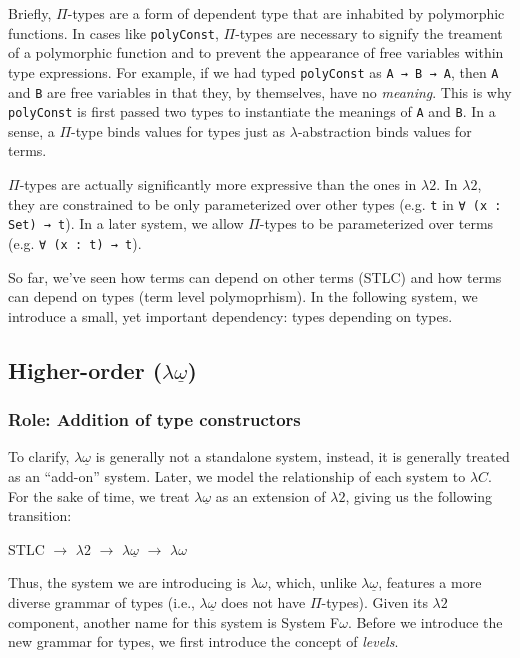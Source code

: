 \documentclass[12pt]{article}
\begin{document}
Briefly, \(\Pi\)-types are a form of dependent type that are inhabited by
polymorphic functions. In cases like {\tt polyConst}, \(\Pi\)-types are
necessary to signify the treament of a polymorphic function and to prevent
the appearance of free variables within type expressions. For example,
if we had typed {\tt polyConst} as {\tt A → B → A}, then {\tt A} and {\tt B} are
free variables in that they, by themselves, have no {\em meaning}. This is why
{\tt polyConst} is first passed two types to instantiate the meanings of {\tt A}
and {\tt B}. In a sense, a \(\Pi\)-type binds values for types just as
\(\lambda\)-abstraction binds values for terms.

\(\Pi\)-types are actually significantly more expressive than the ones in
\(\lambda2\). In \(\lambda2\), they are constrained to be only parameterized
over other types (e.g. {\tt t} in {\tt ∀ (x : Set) → t}). In a later system, we
allow \(\Pi\)-types to be parameterized over terms (e.g. {\tt ∀ (x : t) → t}).

So far, we've seen how terms can depend on other terms (STLC) and how terms can
depend on types (term level polymoprhism). In the following system, we introduce
a small, yet important dependency: types depending on types.

\subsection*{Higher-order (\(\lambda\underline{\omega}\))}
\subsubsection*{Role: Addition of type constructors}

To clarify, \(\lambda\underline{\omega}\) is generally not a standalone system,
instead, it is generally treated as an ``add-on'' system. Later, we model the
relationship of each system to \(\lambda C\). For the sake of time, we treat
\(\lambda\underline{\omega}\) as an extension of \(\lambda2\), giving us the
following transition:

\begin{center}
\begin{minipage}{0.4\textwidth}
STLC \(\rightarrow\) \(\lambda2\) \(\rightarrow\) \(\lambda\underline{\omega}\) \(\rightarrow\) \(\lambda\omega\)
\end{minipage}
\end{center}

Thus, the system we are introducing is \(\lambda\omega\), which, unlike
\(\lambda\underline{\omega}\), features a more diverse grammar of types (i.e.,
\(\lambda\underline{\omega}\) does not have \(\Pi\)-types). Given its \(\lambda2\)
component, another name for this system is System F\(\omega\). Before we introduce
the new grammar for types, we first introduce the concept of {\em levels}.
\end{document}
